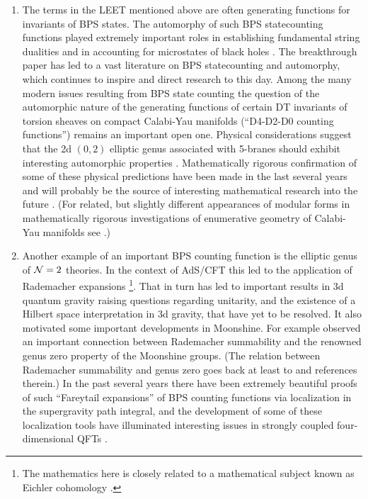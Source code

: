 \documentclass[12pt]{article}
\begin{document}
\begin{enumerate}
\item The terms in the LEET mentioned above 
are often generating functions for invariants
of BPS states. The automorphy of such BPS statecounting functions played extremely important roles in establishing fundamental string dualities 
\cite{Bershadsky:1995qy,Ferrara:1995yx,GottscheHilbScheme,
Sen:1999bqa,Sen:2001di,Vafa:1994tf,Vafa:1995bm}  and
in accounting for microstates of black holes \cite{Strominger:1996sh}. 
The breakthrough paper \cite{Strominger:1996sh}
has led to a vast literature on BPS statecounting and automorphy, which 
continues to inspire and direct research to this day.  
Among the many modern issues resulting from BPS state counting 
the question of the automorphic nature of the
generating functions of  certain DT invariants  of
torsion sheaves on compact Calabi-Yau manifolds  (``D4-D2-D0 counting functions'')  remains an important 
open one. Physical considerations suggest that the 2d $(0,2)$ elliptic genus associated with 5-branes should exhibit interesting automorphic properties 
\cite{deBoer:2006vg,Denef:2007vg,Gaiotto:2006wm,Gaiotto:2007cd,Ooguri:2004zv,Alexandrov:2019rth,Alexandrov:2022pgd}.  Mathematically rigorous
confirmation of some of these physical predictions have been made in the last several
years and will probably be the source of interesting mathematical research into the   
future \cite{Bouchard:2016lfg,klemm2008noetherlefschetz,
Gholampour:2013hfa,maulik2012gromovwitten,TodaFlop,toda2013sduality,
toda2014generalized}.
(For related, but slightly different appearances of modular forms in 
mathematically rigorous investigations of 
enumerative geometry of Calabi-Yau manifolds see 
\cite{Bryan:2018nlv,Bryan:2019qex,Maulik-Pandhari-Thomas}.)  


\item Another example of an important BPS counting function is the elliptic genus of ${\cal N}=2$ theories. In the context of AdS/CFT this led to the application of Rademacher expansions \cite{Dijkgraaf:2000fq,Manschot:2007ha,Cheng:2011ay,Cheng:2012qc,Cheng:2012rca,Cheng:2012tq}
\footnote{The mathematics here is closely related to a mathematical subject known as 
Eichler cohomology \cite{KnoppEichlerCoho,Knopp-Rademacher,NieburAutomorphic}. }.
That in turn has led to important results in 3d quantum gravity \cite{Maloney:2007ud} raising questions regarding unitarity, and the existence of a Hilbert space interpretation in 3d gravity,  that have yet to be resolved. It also motivated some important developments in Moonshine. For example \cite{Duncan:2009sq}  observed an important connection between
Rademacher summability and the renowned genus zero property of the Moonshine groups.
(The relation between Rademacher summability 
and genus zero goes back at least to 
\cite{Knopp-Rademacher} and references therein.)
In the past several years there have been extremely beautiful proofs of such
``Fareytail expansions'' of BPS counting functions via localization in the supergravity path integral, and the development
of some of these localization tools have illuminated interesting issues in strongly
coupled four-dimensional QFTs \cite{Dabholkar:2011ec,Dabholkar:2014ema,Gupta:2012cy,Jeon:2018kec,Murthy:2015yfa}. 



\end{enumerate}
\end{document}
